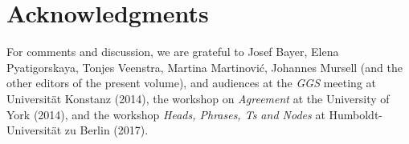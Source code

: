 \documentclass[output=paper
,modfonts
,nonflat]{langsci/langscibook}
\begin{document}
	\section*{Acknowledgments}
	For comments and discussion, we are grateful to Josef Bayer, Elena
	Pyatigorskaya, Tonjes Veenstra, Martina Martinovi\'c, Johannes Mursell
	(and the other editors of the present volume), and audiences at the
	{\itshape GGS} meeting at Universität Konstanz (2014), the workshop on
	{\itshape Agreement} at the University of York (2014), and the workshop
	{\itshape Heads, Phrases, Ts and Nodes} at Humboldt-Universität zu Berlin (2017).
	
	{\sloppy\printbibliography[heading=subbibliography,notkeyword=this]}
\end{document}
